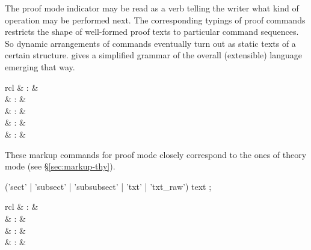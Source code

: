 \begin{isabellebody}
\begin{isamarkuptext}
  The proof mode indicator may be read as a verb telling the writer
  what kind of operation may be performed next.  The corresponding
  typings of proof commands restricts the shape of well-formed proof
  texts to particular command sequences.  So dynamic arrangements of
  commands eventually turn out as static texts of a certain structure.
   gives a simplified grammar of the overall
  (extensible) language emerging that way.%
\end{isamarkuptext}%
\isamarkuptrue%
%
\isamarkuptrue%
%
\begin{isamarkuptext}%
\begin{matharray}{rcl}
     & : &  \\
     & : &  \\
     & : &  \\
     & : &  \\
     & : &  \\
  \end{matharray}

  These markup commands for proof mode closely correspond to the ones
  of theory mode (see \S\ref{sec:markup-thy}).

  \begin{rail}
    ('sect' | 'subsect' | 'subsubsect' | 'txt' | 'txt\_raw') text
    ;
  \end{rail}%
\end{isamarkuptext}%
\isamarkuptrue%
%
\isamarkuptrue%
%
\begin{isamarkuptext}%
\begin{matharray}{rcl}
     & : &  \\
     & : &  \\
     & : &  \\
     & : &  \\
  \end{matharray}


\end{isamarkuptext}
\end{isabellebody}
